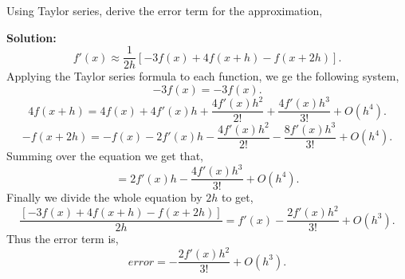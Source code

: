 \documentclass[12pt]{article}
\makeatletter
\theoremstyle{homework}
\newenvironment{exercise}[1]
{\def\@currentlabel{#1}\exercisecore}
{\endexercisecore}
\newcommand{\localhead}[1]{\par\smallskip\noindent\textbf{#1}\nobreak\\}%
\newcommand\solution{\localhead{Solution:}}
\makeatother
\begin{document}
\begin{exercise}{Problem 9.5} Using Taylor series, derive the error term for the approximation,\\

    \solution 

    \begin{equation*}
        f'(x) \approx \dfrac{1}{2h}[-3f(x) + 4f(x+h) - f(x + 2h)].
    \end{equation*}
    Applying the Taylor series formula to each function, we ge the following system,
    \begin{equation*}
        -3f(x) = -3f(x).
    \end{equation*}
    \begin{equation*}
        4f(x + h) = 4f(x) + 4f'(x)h + \dfrac{4f'(x)h^2}{2!} + \dfrac{4f'(x)h^3}{3!} + O(h^4).
    \end{equation*}
    \begin{equation*}
        -f(x + 2h) = -f(x)  - 2f'(x)h  - \dfrac{4f'(x)h^2}{2!} - \dfrac{8f'(x)h^3}{3!} + O(h^4).
    \end{equation*}
    Summing over the equation we get that,
    \begin{equation*}
        [-3f(x) + 4f(x+h) - f(x + 2h)] = 2f'(x)h - \dfrac{4f'(x)h^3}{3!} + O(h^4).
    \end{equation*}
    Finally we divide the whole equation by $2h$ to get,
    \begin{equation*}
        \dfrac{[-3f(x) + 4f(x+h) - f(x + 2h)]}{2h} = f'(x) - \dfrac{2f'(x)h^2}{3!} + O(h^3).
    \end{equation*}
    Thus the error term is,
    \begin{equation*}
        error = -\dfrac{2f'(x)h^2}{3!} + O(h^3).
    \end{equation*}
\end{exercise}
\end{document}
